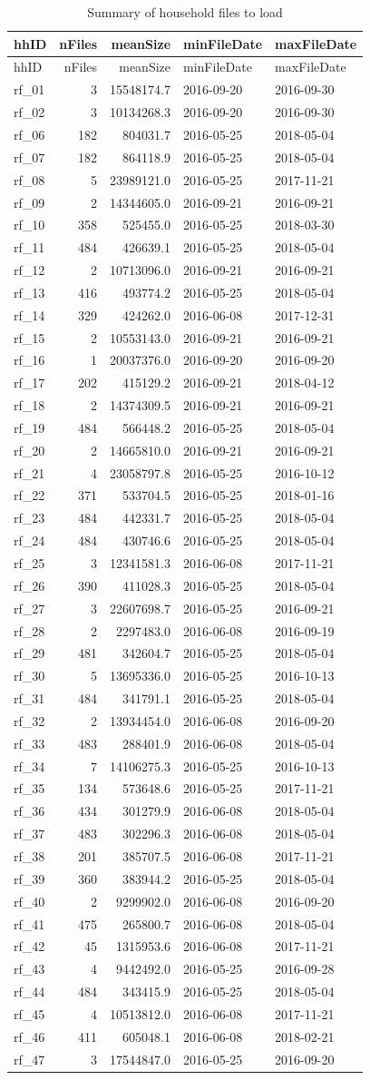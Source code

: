 \documentclass[]{article}
\begin{document}
\begin{longtable}[]{@{}lrrll@{}}
\caption{Summary of household files to load}\tabularnewline
\toprule
hhID & nFiles & meanSize & minFileDate & maxFileDate\tabularnewline
\midrule
\endfirsthead
\toprule
hhID & nFiles & meanSize & minFileDate & maxFileDate\tabularnewline
\midrule
\endhead
rf\_01 & 3 & 15548174.7 & 2016-09-20 & 2016-09-30\tabularnewline
rf\_02 & 3 & 10134268.3 & 2016-09-20 & 2016-09-30\tabularnewline
rf\_06 & 182 & 804031.7 & 2016-05-25 & 2018-05-04\tabularnewline
rf\_07 & 182 & 864118.9 & 2016-05-25 & 2018-05-04\tabularnewline
rf\_08 & 5 & 23989121.0 & 2016-05-25 & 2017-11-21\tabularnewline
rf\_09 & 2 & 14344605.0 & 2016-09-21 & 2016-09-21\tabularnewline
rf\_10 & 358 & 525455.0 & 2016-05-25 & 2018-03-30\tabularnewline
rf\_11 & 484 & 426639.1 & 2016-05-25 & 2018-05-04\tabularnewline
rf\_12 & 2 & 10713096.0 & 2016-09-21 & 2016-09-21\tabularnewline
rf\_13 & 416 & 493774.2 & 2016-05-25 & 2018-05-04\tabularnewline
rf\_14 & 329 & 424262.0 & 2016-06-08 & 2017-12-31\tabularnewline
rf\_15 & 2 & 10553143.0 & 2016-09-21 & 2016-09-21\tabularnewline
rf\_16 & 1 & 20037376.0 & 2016-09-20 & 2016-09-20\tabularnewline
rf\_17 & 202 & 415129.2 & 2016-09-21 & 2018-04-12\tabularnewline
rf\_18 & 2 & 14374309.5 & 2016-09-21 & 2016-09-21\tabularnewline
rf\_19 & 484 & 566448.2 & 2016-05-25 & 2018-05-04\tabularnewline
rf\_20 & 2 & 14665810.0 & 2016-09-21 & 2016-09-21\tabularnewline
rf\_21 & 4 & 23058797.8 & 2016-05-25 & 2016-10-12\tabularnewline
rf\_22 & 371 & 533704.5 & 2016-05-25 & 2018-01-16\tabularnewline
rf\_23 & 484 & 442331.7 & 2016-05-25 & 2018-05-04\tabularnewline
rf\_24 & 484 & 430746.6 & 2016-05-25 & 2018-05-04\tabularnewline
rf\_25 & 3 & 12341581.3 & 2016-06-08 & 2017-11-21\tabularnewline
rf\_26 & 390 & 411028.3 & 2016-05-25 & 2018-05-04\tabularnewline
rf\_27 & 3 & 22607698.7 & 2016-05-25 & 2016-09-21\tabularnewline
rf\_28 & 2 & 2297483.0 & 2016-06-08 & 2016-09-19\tabularnewline
rf\_29 & 481 & 342604.7 & 2016-05-25 & 2018-05-04\tabularnewline
rf\_30 & 5 & 13695336.0 & 2016-05-25 & 2016-10-13\tabularnewline
rf\_31 & 484 & 341791.1 & 2016-05-25 & 2018-05-04\tabularnewline
rf\_32 & 2 & 13934454.0 & 2016-06-08 & 2016-09-20\tabularnewline
rf\_33 & 483 & 288401.9 & 2016-06-08 & 2018-05-04\tabularnewline
rf\_34 & 7 & 14106275.3 & 2016-05-25 & 2016-10-13\tabularnewline
rf\_35 & 134 & 573648.6 & 2016-05-25 & 2017-11-21\tabularnewline
rf\_36 & 434 & 301279.9 & 2016-06-08 & 2018-05-04\tabularnewline
rf\_37 & 483 & 302296.3 & 2016-06-08 & 2018-05-04\tabularnewline
rf\_38 & 201 & 385707.5 & 2016-06-08 & 2017-11-21\tabularnewline
rf\_39 & 360 & 383944.2 & 2016-05-25 & 2018-05-04\tabularnewline
rf\_40 & 2 & 9299902.0 & 2016-06-08 & 2016-09-20\tabularnewline
rf\_41 & 475 & 265800.7 & 2016-06-08 & 2018-05-04\tabularnewline
rf\_42 & 45 & 1315953.6 & 2016-06-08 & 2017-11-21\tabularnewline
rf\_43 & 4 & 9442492.0 & 2016-05-25 & 2016-09-28\tabularnewline
rf\_44 & 484 & 343415.9 & 2016-05-25 & 2018-05-04\tabularnewline
rf\_45 & 4 & 10513812.0 & 2016-06-08 & 2017-11-21\tabularnewline
rf\_46 & 411 & 605048.1 & 2016-06-08 & 2018-02-21\tabularnewline
rf\_47 & 3 & 17544847.0 & 2016-05-25 & 2016-09-20\tabularnewline
\bottomrule
\end{longtable}
\end{document}
